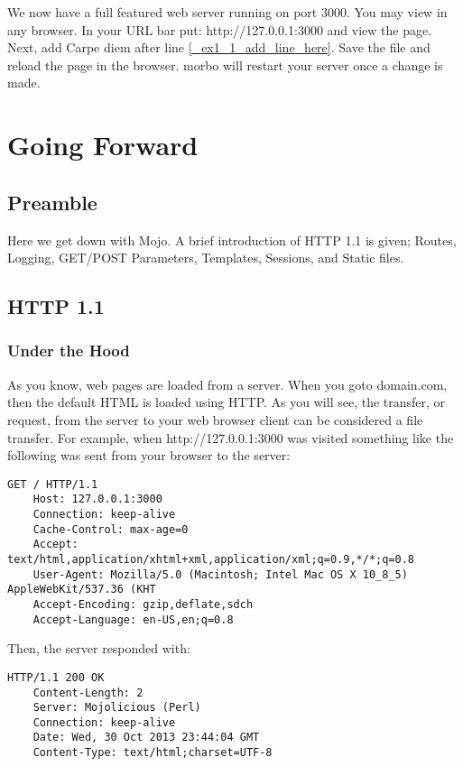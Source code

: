 \documentclass[16pt,pdftex]{book}
\begin{document}
We now have a full featured web server running on port 3000. You may view in
any browser. In your URL bar put: http://127.0.0.1:3000 and view the page.
Next, add Carpe diem after line \ref{_ex1_1_add_line_here}. Save the file and reload
the page in the browser. morbo will restart your server once a change is made.

\chapter*{Going Forward}

\section{Preamble}

Here we get down with Mojo.  A brief introduction of HTTP 1.1 is given; Routes,
Logging, GET/POST Parameters, Templates, Sessions, and Static files.

\section{HTTP 1.1}

\subsection{Under the Hood}

As you know, web pages are loaded from a server. When you goto domain.com, then
the default HTML is loaded using HTTP.  As you will see, the transfer, or
request, from the server to your web browser client can be considered a file
transfer. For example, when http://127.0.0.1:3000 was visited something like
the following was sent from your browser to the server:

\begin{lstlisting}[style=BlockStyle]
    GET / HTTP/1.1
    Host: 127.0.0.1:3000
    Connection: keep-alive
    Cache-Control: max-age=0
    Accept: text/html,application/xhtml+xml,application/xml;q=0.9,*/*;q=0.8
    User-Agent: Mozilla/5.0 (Macintosh; Intel Mac OS X 10_8_5) AppleWebKit/537.36 (KHT
    Accept-Encoding: gzip,deflate,sdch
    Accept-Language: en-US,en;q=0.8
\end{lstlisting}

Then, the server responded with:

\begin{lstlisting}[style=BlockStyle]
    HTTP/1.1 200 OK
    Content-Length: 2
    Server: Mojolicious (Perl)
    Connection: keep-alive
    Date: Wed, 30 Oct 2013 23:44:04 GMT
    Content-Type: text/html;charset=UTF-8
\end{lstlisting}
\end{document}
